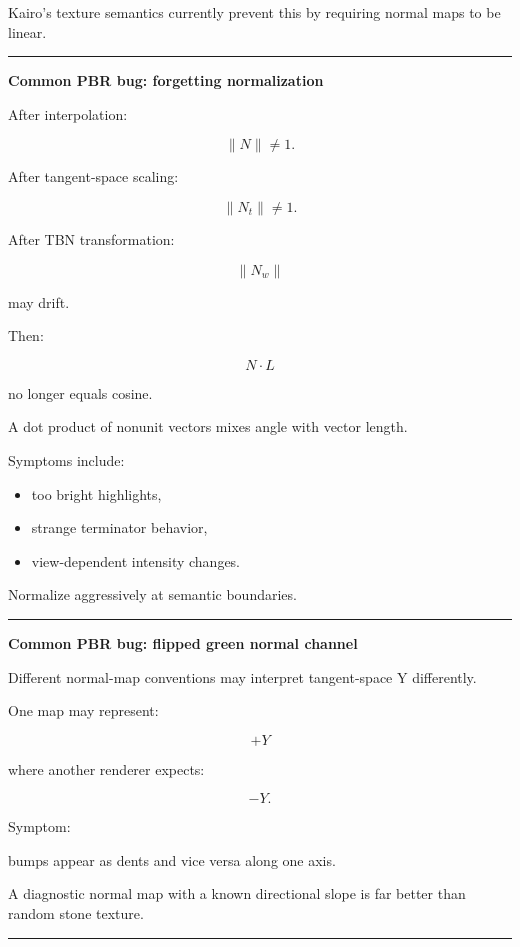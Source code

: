 Kairo's texture semantics currently prevent this by requiring normal maps to be linear.

\begin{center}\rule{0.5\linewidth}{0.5pt}\end{center}

\textbf{Common PBR bug: forgetting normalization}

After interpolation:

\[
\|N\|\neq1.
\]

After tangent-space scaling:

\[
\|N_t\|\neq1.
\]

After TBN transformation:

\[
\|N_w\|
\]

may drift.

Then:

\[
N\cdot L
\]

no longer equals cosine.

A dot product of nonunit vectors mixes angle with vector length.

Symptoms include:

\begin{itemize}
\tightlist
\item
  too bright highlights,
\item
  strange terminator behavior,
\item
  view-dependent intensity changes.
\end{itemize}

Normalize aggressively at semantic boundaries.

\begin{center}\rule{0.5\linewidth}{0.5pt}\end{center}

\textbf{Common PBR bug: flipped green normal channel}

Different normal-map conventions may interpret tangent-space Y differently.

One map may represent:

\[
+Y
\]

where another renderer expects:

\[
-Y.
\]

Symptom:

bumps appear as dents and vice versa along one axis.

A diagnostic normal map with a known directional slope is far better than random stone texture.

\begin{center}\rule{0.5\linewidth}{0.5pt}\end{center}

